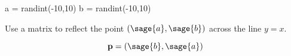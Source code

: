 \documentclass{ximera}
\author{Jenny Sheldon \and Bart Snapp}
\begin{document}
\makerandom
 
\begin{sagesilent}
  a = randint(-10,10)
  b = randint(-10,10)
\end{sagesilent}

\begin{exercise}
  Use a matrix to reflect the point $(\sage{a},\sage{b})$ across the
  line $y=x$.
  \begin{prompt}
    \[
    \vec{p} = (\sage{b},\sage{a})
    \]
  \end{prompt}
\end{exercise}
\end{document}
